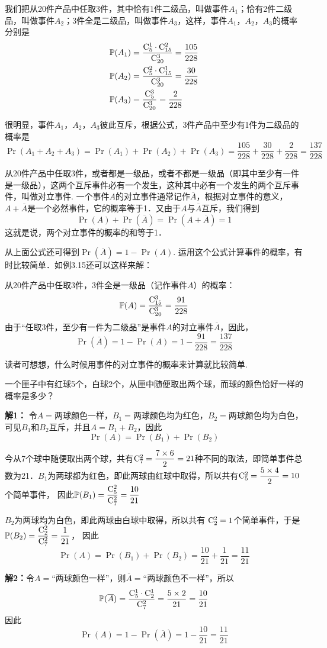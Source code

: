 \begin{solution}
    我们把从20件产品中任取3件，其中恰有1件二级品，叫做事件$A_1$；恰有2件二级品，叫做事件$A_2$；3件全是二级品，叫做事件$A_3$，这样，事件$A_1$，$A_2$，$A_3$的概率分别是
\[\begin{split}
    \mathbb{P}(A_1)&=\dfrac{{\rm C}^{1}_{5}\cdot {\rm C}^{2}_{15}}{{\rm C}^{3}_{20}}=\dfrac{105}{228}\\
    \mathbb{P}(A_2)&=\dfrac{{\rm C}^{2}_{5}\cdot {\rm C}^{1}_{15}}{{\rm C}^{3}_{20}}=\dfrac{30}{228}\\
    \mathbb{P}(A_3)&=\dfrac{{\rm C}^{3}_{5}}{{\rm C}^{3}_{20}}=\dfrac{2}{228}\\
\end{split}\]

很明显，事件$A_1$，$A_2$，$A_3$彼此互斥，根据公式，3件产品中至少有1件为二级品的概率是
\[\Pr(A_1+A_2+A_3)=\Pr(A_1)+\Pr(A_2)+\Pr(A_3)=\frac{105}{228}+\frac{30}{228}+\frac{2}{228}=\frac{137}{228}\]

从20件产品中任取3件，或者都是一级品，或者不都是一级品（即其中至少有一件是一级品），这两个互斥事件必有一个发生，这种其中必有一个发生的两个互斥事件，叫做对立事件. 一个事件$A$的对立事件通常记作$\overline{A}$，根据对立事件的意义，$A+\overline{A}$是一个必然事件，它的概率等于1．又由于$A$与$\overline{A}$互斥，我们得到
\[\Pr(A)+\Pr(\overline{A})=\Pr(A+\overline{A})=1\]
这就是说，两个对立事件的概率的和等于1．

从上面公式还可得到$\Pr(\overline{A})=1-\Pr(A)$. 
运用这个公式计算事件的概率，有时比较简单．如例3.15还可以这样来解：

从20件产品中任取3件，3件全是一级品（记作事件$A$）的概率：
\[\mathbb{P}(A)=\dfrac{{\rm C}^{3}_{15}}{{\rm C}^{3}_{20}}=\dfrac{91}{228}\]
由于“任取3件，至少有一件为二级品”是事件$A$的对立事件$\overline{A}$，因此，
\[\Pr(\overline{A})=1-\Pr(A)=1-\frac{91}{228}=\frac{137}{228}\]

读者可想想，什么时候用事件的对立事件的概率来计算就比较简单.
\end{solution}

\begin{example}
一个匣子中有红球5个，白球2个，从匣中随便取出两个球，而球的颜色恰好一样的概率是多少？
\end{example}

\begin{solution}
\textbf{解1：} 令$A=$两球颜色一样，$B_1=$两球颜色均为红色，$B_2=$两球颜色均为白色，可见$B_1$和$B_2$互斥，并且$A=B_1+B_2$，因此
\[\Pr(A)=\Pr(B_1)+\Pr(B_2)\]

今从7个球中随便取出两个球，共有${\rm C}^{2}_{7}=\dfrac{7\times 6}{2}=21$种不同的取法，即简单事件总数为21．$B_1$为两球都为红色，即此两球由红球中取得，所以共有${\rm C}^{2}_{5}=\dfrac{5\times4}{2}=10$个简单事件，
因此$\mathbb{P}(B_1)=\dfrac{{\rm C}^{2}_{5}}{{\rm C}^{2}_{7}}=\dfrac{10}{21}$

$B_2$为两球均为白色，即此两球由白球中取得，所以共有
${\rm C}^{2}_{2}=1$个简单事件，于是$\mathbb{P}(B_2)=\dfrac{{\rm C}^{2}_{2}}{{\rm C}^{2}_{7}}=\dfrac{1}{21}$，
因此
\[\Pr(A)=\Pr(B_1)+\Pr(B_2)=\frac{10}{21}+\frac{1}{21}=\frac{11}{21}\]

\textbf{解2：}令$A=$“两球颜色一样”，则$\overline{A}=$“两球颜色不一样”，所以
\[\mathbb{P}(\overline{A})=\dfrac{{\rm C}^{1}_{5}\cdot {\rm C}^{1}_{2}}{{\rm C}^{2}_{7}}=\dfrac{5\times 2}{21}=\dfrac{10}{21}\]
因此
\[\Pr(A)=1-\Pr(\overline{A})=1-\frac{10}{21}=\frac{11}{21}\]
\end{solution}

